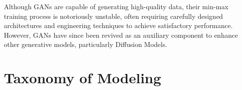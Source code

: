 







Although GANs are capable of generating high-quality data, their min-max training process is notoriously unstable, often requiring carefully designed architectures and engineering techniques to achieve satisfactory performance. However, GANs have since been revived as an auxiliary component to enhance other generative models, particularly Diffusion Models.






\newpage
\section{Taxonomy of Modeling}\label{sec:taxonomy}


